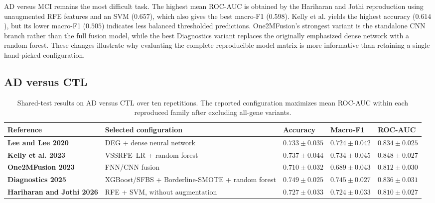 AD versus MCI remains the most difficult task. The highest mean ROC-AUC is obtained by the Hariharan and Jothi reproduction using unaugmented RFE features and an SVM (\(0.657\)), which also gives the best macro-F1 (\(0.598\)). Kelly et al. yields the highest accuracy (\(0.614\)), but its lower macro-F1 (\(0.505\)) indicates less balanced thresholded predictions. One2MFusion's strongest variant is the standalone CNN branch rather than the full fusion model, while the best Diagnostics variant replaces the originally emphasized dense network with a random forest. These changes illustrate why evaluating the complete reproducible model matrix is more informative than retaining a single hand-picked configuration.

\subsection*{AD versus CTL}

\begin{table}[htbp]
\centering
\begingroup
\footnotesize
\renewcommand{\arraystretch}{1.35}
\setlength{\tabcolsep}{3.5pt}
\begin{tabularx}{\textwidth}{
    >{\raggedright\arraybackslash}p{}
    >{\raggedright\arraybackslash}X
    >{\centering\arraybackslash}p{}
    >{\centering\arraybackslash}p{}
    >{\centering\arraybackslash}p{}
}
\toprule
\rowcolor{gray!18}
\textbf{Reference} &
\textbf{Selected configuration} &
\textbf{Accuracy} &
\textbf{Macro-F1} &
\textbf{ROC-AUC} \\
\midrule

\textbf{Lee and Lee 2020} &
DEG + dense neural network &
\(0.733 \pm 0.035\) &
\(0.724 \pm 0.042\) &
\(0.834 \pm 0.025\) \\

\rowcolor{gray!5}
\textbf{Kelly et al. 2023} &
VSSRFE--LR + random forest &
\(0.737 \pm 0.044\) &
\(0.734 \pm 0.045\) &
\(\mathbf{0.848 \pm 0.027}\) \\

\textbf{One2MFusion 2023} &
FNN/CNN fusion &
\(0.710 \pm 0.032\) &
\(0.689 \pm 0.043\) &
\(0.812 \pm 0.030\) \\

\rowcolor{gray!5}
\textbf{Diagnostics 2025} &
XGBoost/SFBS + Borderline-SMOTE + random forest &
\(\mathbf{0.749 \pm 0.025}\) &
\(\mathbf{0.745 \pm 0.027}\) &
\(0.836 \pm 0.031\) \\

\textbf{Hariharan and Jothi 2026} &
RFE + SVM, without augmentation &
\(0.727 \pm 0.033\) &
\(0.724 \pm 0.033\) &
\(0.810 \pm 0.027\) \\

\bottomrule
\end{tabularx}
\endgroup
\caption{Shared-test results on AD versus CTL over ten repetitions. The reported configuration maximizes mean ROC-AUC within each reproduced family after excluding all-gene variants.}
\label{tab:ad-ctl-sota-results}
\end{table}

